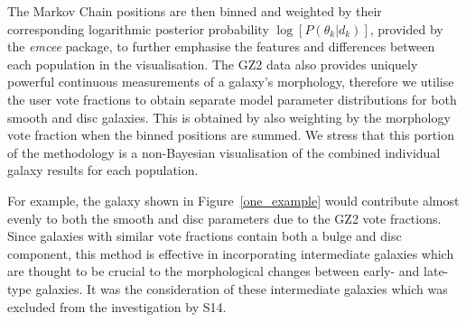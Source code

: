 The Markov Chain positions are then binned and weighted by their corresponding logarithmic posterior probability $\log [P(\theta_k|d_k)]$, provided by the \emph{emcee} package, to further emphasise the features and differences between each population in the visualisation. The GZ2 data also provides uniquely powerful continuous measurements of a galaxy's morphology, therefore we utilise the user vote fractions to obtain separate model parameter distributions for both smooth and disc galaxies. This is obtained by also weighting by the morphology vote fraction when the binned positions are summed. We stress that this portion of the methodology is a non-Bayesian visualisation of the combined individual galaxy results for each population.

For example, the galaxy shown in Figure~\ref{one_example} would contribute almost evenly to both the smooth and disc parameters due to the GZ2 vote fractions. Since galaxies with similar vote fractions contain both a bulge and disc component, this method is effective in incorporating intermediate galaxies which are thought to be crucial to the morphological changes between early- and late-type galaxies. It was the consideration of these intermediate galaxies which was excluded from the investigation by S14.
